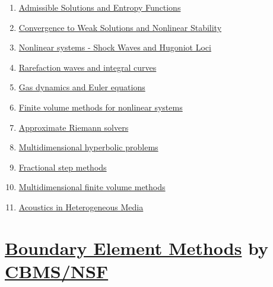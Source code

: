 \documentclass[11pt]{article}
\begin{document}
\begin{enumerate}
	\item \href{https://mp.weixin.qq.com/s/MMyTTCNwX3j5VaY1weNJ9Q}{Admissible Solutions and Entropy Functions}	%
	\item \href{https://mp.weixin.qq.com/s/q_4G35hsGqc-Lc7AL8dSqw}{Convergence to Weak Solutions and Nonlinear Stability}	%
	\item \href{https://mp.weixin.qq.com/s/s1VXAORVgAqX46NljJkutQ}{Nonlinear systems - Shock Waves and Hugoniot Loci}	%
	\item \href{https://mp.weixin.qq.com/s/t29iY8mWrpmYoqqzy4ihaQ}{Rarefaction waves and integral curves}	%
	\item \href{https://mp.weixin.qq.com/s/YplLOv8ap0Hd0QRfNL2rGw}{Gas dynamics and Euler equations}	%
	\item \href{https://mp.weixin.qq.com/s/-47qZ8945-OBiTqMZHuztQ}{Finite volume methods for nonlinear systems}	%
	\item \href{https://mp.weixin.qq.com/s/x9bgq7QhyurGpwi2hIs3wQ}{Approximate Riemann solvers}	%
	\item \href{https://mp.weixin.qq.com/s/FDZ8-vNbHevhXyT1Osor_g}{Multidimensional hyperbolic problems}	%
	\item \href{https://mp.weixin.qq.com/s/0XN06E5tjGMBbkMIZFBb9A}{Fractional step methods}	%
	\item \href{https://mp.weixin.qq.com/s/GMDjgzyoD1YxtU1_9Bvk-Q}{Multidimensional finite volume methods}	%
	\item \href{https://mp.weixin.qq.com/s/RLKxb3c59yKpl16LpPDSYQ}{Acoustics in Heterogeneous Media}	%
\end{enumerate}

\newpage 

\section[Boundary Element Methods]{{\large   \href{https://www.youtube.com/playlist?list=PLPDZ9rcIfxyOrlpcu_D1PRcyK-o2iofwW}{Boundary Element Methods}} by {\large \href{https://pefarrell.org/}{CBMS/NSF}}}

\vspace{-0.5cm}
\end{document}
